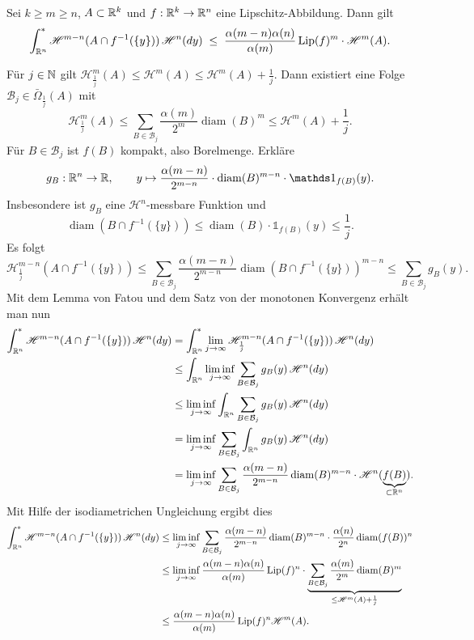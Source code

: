 \documentclass[a4paper,twoside,DIV15,BCOR12mm]{scrbook}
\newcommand{\ind}{\mathds 1}
\newcommand{\HM}{\mathscr H}
\DeclareMathOperator{\diam}{diam}
\DeclareMathOperator{\Lip}{Lip}
\begin{document}
\begin{lemma}\label{lem:3.10}
Sei \(k\geq m\geq n\), \(A\subset\mathbb{R}^k\) und \(f: \mathbb{R}^k \to \mathbb{R}^n\) eine Lipschitz-Abbildung. Dann gilt
\[
\int_{\MdR^n}^* \HM^{m-n}(A \cap f^{-1}(\{y\}))\, \HM^n(dy) \; \leq \; \frac{\alpha(m-n) \alpha(n)}{\alpha(m)} \Lip(f)^m \cdot \HM^m(A).
\]
\end{lemma}
\begin{beweis}
Für \(j \in \mathbb{N}\) gilt \(\HM^m_{\frac1j}(A) \leq \HM^m(A) \leq \HM^m(A) + \frac1j\). Dann existiert eine Folge \(\mathcal B_j \in \bar\Omega_{\frac1j}(A)\) mit
\[
\HM^m_{\frac1j}(A) \leq \sum_{B\in\mathcal B_j} \frac{\alpha(m)}{2^m} \diam (B)^m \leq \HM^m(A)+\frac1j.
\]
Für \(B \in \mathcal B_j\) ist \(f(B)\) kompakt, also Borelmenge. Erkläre 
$$g_B: \MdR^n \to \MdR,\qquad  y \mapsto \frac{\alpha(m-n)}{2^{m-n}}\cdot\diam(B)^{m-n}\cdot\ind_{f(B)}(y).
$$ 
Insbesondere ist \(g_B\) eine \(\HM^n\)-messbare Funktion und 
$$
\diam(B\cap f^{-1}(\{y\})) \leq \diam(B) \cdot \ind_{f(B)}(y) \leq \frac1j. 
$$
Es folgt
\[
\HM_{\frac1j}^{m-n}(A\cap f^{-1}(\{y\})) \leq \sum_{B \in \mathcal B_j} \frac{\alpha(m-n)}{2^{m-n}} \diam(B\cap f^{-1}(\{y\}))^{m-n} \leq \sum_{B \in \mathcal B_j} g_B(y).
\]
Mit dem Lemma von Fatou und dem Satz von der monotonen Konvergenz  erhält man nun
\begin{align*}
\int_{\MdR^n}^* \HM^{m-n}(A \cap f^{-1}(\{y\})) \,\HM^n(dy) &= \int_{\MdR^n}^* \lim_{j\to\infty} \HM_{\frac1j}^{m-n}(A\cap f^{-1}(\{y\})) \,\HM^n(dy) \\
&\leq \int_{\MdR^n} \liminf_{j\to\infty} \sum_{B\in\mathcal B_j} g_B(y)\, \HM^n(dy) \\
&\leq \liminf_{j\to\infty} \int_{\MdR^n} \sum_{B\in\mathcal B_j} g_B(y) \,\HM^n(dy) \\
&= \liminf_{j\to\infty} \sum_{B\in\mathcal B_j} \int_{\MdR^n} g_B(y) \,\HM^n(dy) \\
&= \liminf_{j\to\infty} \sum_{B\in\mathcal B_j} \frac{\alpha(m-n)}{2^{m-n}} \diam(B)^{m-n} \cdot \HM^n(\underbrace{f(B)}_{\subset \MdR^n}).
\end{align*}
Mit Hilfe der isodiametrichen Ungleichung ergibt dies
\begin{align*}
\int_{\MdR^n}^* \HM^{m-n}(A \cap f^{-1}(\{y\})) \,\HM^n(dy) 
&\leq \liminf_{j\to\infty} \sum_{B\in\mathcal B_j} \frac{\alpha(m-n)}{2^{m-n}}\diam(B)^{m-n} \cdot \frac{\alpha(n)}{2^n}\diam(f(B))^n \\
&\leq \liminf_{j\to\infty} \frac{\alpha(m-n)\alpha(n)}{\alpha(m)} \Lip(f)^n \cdot \underbrace{\sum_{B\in\mathcal B_j} \frac{\alpha(m)}{2^m}\diam(B)^m}_{\le \HM^m(A) + \frac1j} \\
&\le \frac{\alpha(m-n)\alpha(n)}{\alpha(m)}\Lip(f)^n\HM^m(A).
\end{align*}
\end{beweis}
\end{document}
